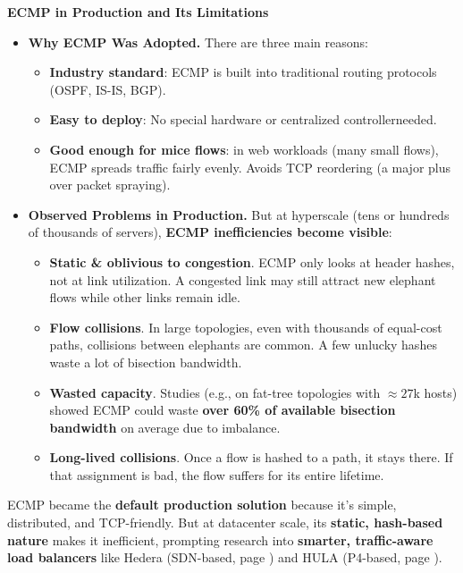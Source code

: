 \highspace
\begin{flushleft}
    \textcolor{Green3}{ \textbf{ECMP in Production and Its Limitations}}
\end{flushleft}
\begin{itemize}
    \item[\textcolor{Green3}{\faIcon{question-circle}}] \textcolor{Green3}{\textbf{Why ECMP Was Adopted.}} There are three main reasons:
    \begin{itemize}
        \item \textbf{Industry standard}: ECMP is built into traditional routing protocols (OSPF, IS-IS, BGP).
        \item \textbf{Easy to deploy}: No special hardware or centralized controller\break needed.
        \item \textbf{Good enough for mice flows}: in web workloads (many small flows), ECMP spreads traffic fairly evenly. Avoids TCP reordering (a major plus over packet spraying).
    \end{itemize}


    \item[\textcolor{Red2}{\faIcon{exclamation-triangle}}] \textcolor{Red2}{\textbf{Observed Problems in Production.}} But at hyperscale (tens or hundreds of thousands of servers), \textbf{ECMP inefficiencies become visible}:
    \begin{itemize}
        \item \textbf{Static \& oblivious to congestion}. ECMP only looks at header hashes, not at link utilization. A congested link may still attract new elephant flows while other links remain idle.
        \item \textbf{Flow collisions}. In large topologies, even with thousands of equal-cost paths, collisions between elephants are common. A few unlucky hashes waste a lot of bisection bandwidth.
        \item \textbf{Wasted capacity}. Studies (e.g., on fat-tree topologies with $\approx 27$k hosts) showed ECMP could waste \textbf{over 60\% of available bisection bandwidth} on average due to imbalance.
        \item \textbf{Long-lived collisions}. Once a flow is hashed to a path, it stays there. If that assignment is bad, the flow suffers for its entire lifetime.
    \end{itemize}
\end{itemize}
ECMP became the \textbf{default production solution} because it's simple, distributed, and TCP-friendly. But at datacenter scale, its \textbf{static, hash-based nature} makes it inefficient, prompting research into \textbf{smarter, traffic-aware load balancers} like Hedera (SDN-based, page \pageref{subsection: Hedera - Dynamic Flow Scheduling}) and HULA (P4-based, page \pageref{subsection: HULA - Load Balancing in P4}).

